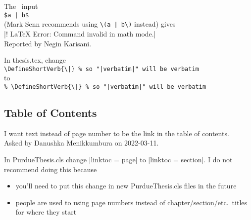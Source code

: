 The \LaTeXLogo\ input\\
 \verb+$a | b$+\\
(Mark Senn recommends using \verb+\(a | b\)+ instead)
gives\\
 |! LaTeX Error: Command \ttfamily invalid in math mode.|\\
Reported by Negin Karisani.

\MyAnswer
In thesis.tex, change\\
 \verb+\DefineShortVerb{\|} % so "|verbatim|" will be verbatim+\\
to\\
 \verb+% \DefineShortVerb{\|} % so "|verbatim|" will be verbatim+

\subsection*{Table of Contents}

I want text instead of page number to be the link
in the table of contents.\\
Asked by Danushka Menikkumbura on 2022-03-11.

\MyAnswer
In PurdueThesis.cls change
|linktoc = page|
to
|linktoc = section|.
I do not recommend doing this because
\begin{itemize}
  \item
    you'll need to put this change
    in new PurdueThesis.cls files in the future
  \item
    people are used to using page numbers instead
    of chapter/section/etc.~titles for where they
    start
\end{itemize}
